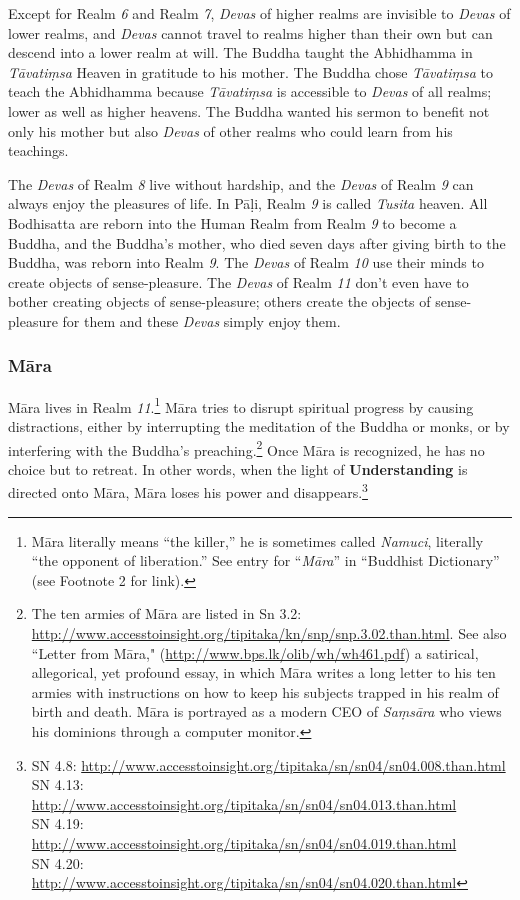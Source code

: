 Except for Realm \textit{6} and Realm \textit{7}, \textit{Devas} of higher realms are invisible to \textit{Devas} of lower realms, and \textit{Devas} cannot travel to realms higher than their own but can descend into a lower realm at will. The Buddha taught the Abhidhamma in \textit{Tāvatiṃsa} Heaven in gratitude to his mother. The Buddha chose \textit{Tāvatiṃsa} to teach the Abhidhamma because \textit{Tāvatiṃsa} is accessible to \textit{Devas} of all realms; lower as well as higher heavens. The Buddha wanted his sermon to benefit not only his mother but also \textit{Devas} of other realms who could learn from his teachings.

The \textit{Devas} of Realm \textit{8} live without hardship, and the \textit{Devas} of Realm \textit{9} can always enjoy the pleasures of life. In Pāḷi, Realm \textit{9} is called \textit{Tusita} heaven. All Bodhisatta are reborn into the Human Realm from Realm \textit{9} to become a Buddha, and the Buddha’s mother, who died seven days after giving birth to the Buddha, was reborn into Realm \textit{9}. The \textit{Devas} of Realm \textit{10} use their minds to create objects of sense-pleasure. The \textit{Devas} of Realm \textit{11} don’t even have to bother creating objects of sense-pleasure; others create the objects of sense-pleasure for them and these \textit{Devas} simply enjoy them.

\subsubsection*{Māra}

Māra lives in Realm \textit{11}.\footnote{Māra literally means “the killer,” he is sometimes called \textit{Namuci}, literally “the opponent of liberation.” See entry for “\textit{Māra}” in “Buddhist Dictionary” (see Footnote 2 for link).} Māra tries to disrupt spiritual progress by causing distractions, either by interrupting the meditation of the Buddha or monks, or by interfering with the Buddha’s preaching.\footnote{The ten armies of Māra are listed in Sn 3.2: \url{http://www.accesstoinsight.org/tipitaka/kn/snp/snp.3.02.than.html}. See also “Letter from Māra," (\url{http://www.bps.lk/olib/wh/wh461.pdf}) a satirical, allegorical, yet profound essay, in which Māra writes a long letter to his ten armies with instructions on how to keep his subjects trapped in his realm of birth and death. Māra is portrayed as a modern CEO of \textit{Saṃsāra} who views his dominions through a computer monitor.} Once Māra is recognized, he has no choice but to retreat. In other words, when the light of \textbf{Understanding} is directed onto Māra, Māra loses his power and disappears.\footnote{SN 4.8: \url{http://www.accesstoinsight.org/tipitaka/sn/sn04/sn04.008.than.html}\\SN 4.13: \url{http://www.accesstoinsight.org/tipitaka/sn/sn04/sn04.013.than.html}\\SN 4.19: \url{http://www.accesstoinsight.org/tipitaka/sn/sn04/sn04.019.than.html}\\SN 4.20: \url{http://www.accesstoinsight.org/tipitaka/sn/sn04/sn04.020.than.html}}

